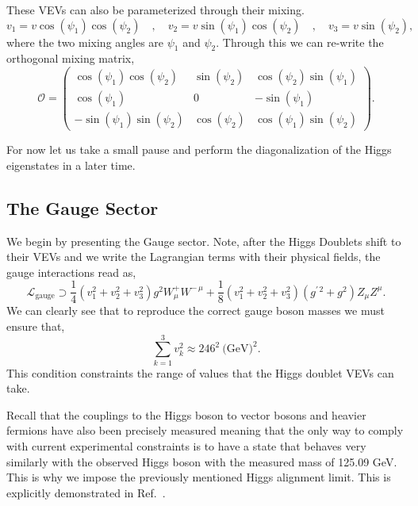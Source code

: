\documentclass[10pt]{report}
\begin{document}
%
These VEVs can also be parameterized through their mixing. 
\begin{equation}
v_1 = v \cos(\psi_1) \cos(\psi_2) \quad , \quad v_2 = v \sin(\psi_1) \cos(\psi_2) \quad , \quad v_3 = v \sin(\psi_2) , 
\end{equation}
%
where the two mixing angles are $\psi_1$ and $\psi_2$. 
%
Through this we can re-write the orthogonal mixing matrix, 
%
\begin{equation}
\label{eq:3HDM_Orthg}
\mathcal{O} = 
\begin{pmatrix}
\cos(\psi_1) \cos(\psi_2) & \sin(\psi_2) & \cos(\psi_2) \sin(\psi_1)   \\ 
\cos(\psi_1) & 0 & - \sin(\psi_1)  \\ 
- \sin(\psi_1) \sin(\psi_2) & \cos(\psi_2) &  \cos(\psi_1) \sin(\psi_2)
\end{pmatrix} . 
\end{equation}

For now let us take a small pause and perform the diagonalization of the Higgs eigenstates in a later time.  

\subsection{The Gauge Sector}

%
We begin by presenting the Gauge sector. 
%
Note, after the Higgs Doublets shift to their VEVs and we write the Lagrangian terms with their physical fields, the gauge interactions read as,  
%
\begin{equation}
\mathcal{L}_{\text{gauge}} \supset \frac{1}{4} \left( v_1^2 + v_2^2  + v_3^2 \right) g^2 W^+_\mu W^{-\,\mu} + \frac{1}{8} \left(  v_1^2 + v_2^2  + v_3^2  \right) \left( g^{\prime \, 2} + g^2 \right) Z_\mu Z^\mu  .
\end{equation}
%
We can clearly see that to reproduce the correct gauge boson masses we must ensure that,
%
\begin{equation}
\label{eq:VEV_Condition}
\sum_{k=1}^3 v_k^2 \approx 246^2 \ \text{(GeV)}^2  . 
\end{equation}
%
This condition constraints the range of values that the Higgs doublet VEVs can take. 

Recall that the couplings to the Higgs boson to vector bosons and heavier fermions have also been precisely measured meaning that the only way to comply with current experimental constraints is to have a state that behaves very similarly with the observed Higgs boson with the measured mass of 125.09 GeV.  This is why we impose the previously mentioned Higgs alignment limit.  This is explicitly demonstrated in Ref.~\cite{das2015implications}.  
\end{document}
